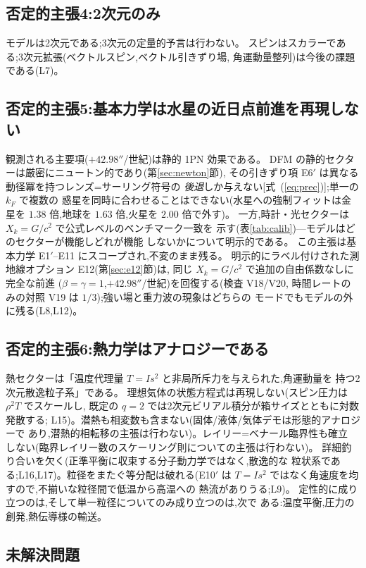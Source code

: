 \documentclass[a4paper,10pt,twocolumn]{ltjsarticle}
\newcommand{\Kt}{X_k}
\begin{document}
\subsection{否定的主張4:2次元のみ}
モデルは2次元である;3次元の定量的予言は行わない。
スピンはスカラーである;3次元拡張(ベクトルスピン,ベクトル引きずり場,
角運動量整列)は今後の課題である(L7)。

\subsection{否定的主張5:基本力学は水星の近日点前進を再現しない}
観測される主要項($+42.98''$/世紀)は静的 1PN 効果である。
DFM の静的セクターは厳密にニュートン的であり(第\ref{sec:newton}節),
その引きずり項 E6$'$ は異なる動径冪を持つレンズ=サーリング符号の
\emph{後退}しか与えない[式~(\ref{eq:prec})];単一の $k_F$ で複数の
惑星を同時に合わせることはできない(水星への強制フィットは金星を
$1.38$ 倍,地球を $1.63$ 倍,火星を $2.00$ 倍で外す)。
一方,時計・光セクターは $\Kt = G/c^2$ で公式レベルのベンチマーク一致を
示す(表\ref{tab:calib})---モデルはどのセクターが機能しどれが機能
しないかについて明示的である。
この主張は基本力学 E1$'$--E11 にスコープされ,不変のまま残る。
明示的にラベル付けされた測地線オプション E12(第\ref{sec:e12}節)は,
同じ $\Kt = G/c^2$ で追加の自由係数なしに完全な前進
($\beta = \gamma = 1$,$+42.98''$/世紀)を回復する(検査 V18/V20,
時間レートのみの対照 V19 は $1/3$);強い場と重力波の現象はどちらの
モードでもモデルの外に残る(L8,L12)。

\subsection{否定的主張6:熱力学はアナロジーである}
熱セクターは「温度代理量 $T = Is^2$ と非局所斥力を与えられた,角運動量を
持つ2次元散逸粒子系」である。
理想気体の状態方程式は再現しない(スピン圧力は $\rho^2T$ でスケールし,
既定の $q = 2$ では2次元ビリアル積分が箱サイズとともに対数発散する;
L15)。潜熱も相変数も含まない(固体/液体/気体デモは形態的アナロジーで
あり,潜熱的相転移の主張は行わない)。レイリー=ベナール臨界性も確立
しない(臨界レイリー数のスケーリング則についての主張は行わない)。
詳細釣り合いを欠く(正準平衡に収束する分子動力学ではなく,散逸的な
粒状系である;L16,L17)。粒径をまたぐ等分配は破れる(E10$'$ は
$T = Is^2$ ではなく角速度を均すので,不揃いな粒径間で低温から高温への
熱流がありうる;L9)。
定性的に成り立つのは,そして単一粒径についてのみ成り立つのは,次で
ある:温度平衡,圧力の創発,熱伝導様の輸送。

\subsection{未解決問題}
\label{sec:limits}
\end{document}
